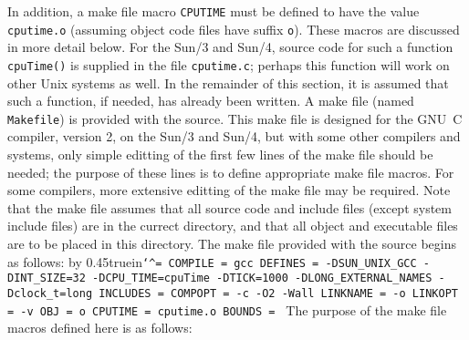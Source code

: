 In addition, a make file macro {\tt CPUTIME} must be defined to have
the value {\tt cputime.o} (assuming object code files have suffix {\tt o}).
These macros are discussed in more detail below.
For the Sun/3 and Sun/4, source code for such a function 
{\tt cpuTime()} is supplied in the file {\tt cputime.c}; perhaps this function
will work on other Unix systems as well.  In the remainder of this section,
it is assumed that such a function, if needed, has already been written.
\medbreak
A make file (named {\tt Makefile}) is provided with the source.  This make file
is designed for the GNU~C compiler, version 2, on the Sun/3 and Sun/4, but with some
other compilers and systems, only simple editting of the first few lines of the make file
should be needed; the purpose of these lines is to define appropriate
make file macros.  For some compilers, more extensive editting of the
make file may be
required.  Note that the make file assumes that all source code and include
files (except system include files) are in the currect directory, and that
all object and executable files are to be placed in this directory.
\medbreak
The make file provided with the source begins as follows:
\medbreak
\vbox{{\elevenpoint\advance\leftskip by 0.45truein\obeywhitespace\tt\catcode`^=\other
COMPILE = gcc
DEFINES = -DSUN\_UNIX\_GCC -DINT\_SIZE=32 -DCPU\_TIME=cpuTime -DTICK=1000 
          -DLONG\_EXTERNAL\_NAMES -Dclock\_t=long 
INCLUDES =
COMPOPT = -c -O2 -Wall  
LINKNAME = -o
LINKOPT = -v
OBJ = o
CPUTIME = cputime.o
BOUNDS =
}}
\medbreak
The purpose of the make file macros defined here is as follows:
\smallbreak
